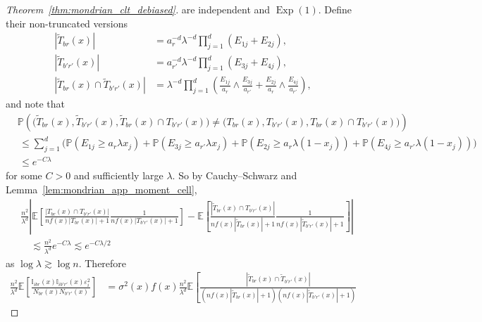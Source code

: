 \documentclass[11pt,lof]{puthesis}
\renewcommand{\P}{\ensuremath{\mathbb{P}}}
\newcommand{\E}{\ensuremath{\mathbb{E}}}
\newcommand{\I}{\ensuremath{\mathbb{I}}}
\DeclareMathOperator{\Exp}{Exp}
\theoremstyle{break}
\theoremstyle{proof}
\newtheorem{proof}{Proof}
\begin{document}
\begin{proof}[Theorem~\ref{thm:mondrian_clt_debiased}]
  are independent and $\Exp(1)$.
  Define their non-truncated versions
  \begin{align*}
    |\tilde T_{b r}(x)|
    &=
    a_r^{-d}
    \lambda^{-d}
    \prod_{j=1}^{d}
    \left( E_{1j} + E_{2j} \right), \\
    |\tilde T_{b' r'}(x)|
    &=
    a_{r'}^{-d}
    \lambda^{-d}
    \prod_{j=1}^{d}
    \left( E_{3j} + E_{4j} \right), \\
    |\tilde T_{b r}(x) \cap \tilde T_{b' r'}(x)|
    &=
    \lambda^{-d}
    \prod_{j=1}^{d}
    \left(
      \frac{E_{1j}}{a_r}
      \wedge
      \frac{E_{3j}}{a_{r'}}
      + \frac{E_{2j}}{a_r}
      \wedge
      \frac{E_{4j}}{a_{r'}}
    \right),
  \end{align*}
  and note that
  \begin{align*}
    &\P \left(
      \big( \tilde T_{b r}(x), \tilde T_{b' r'}(x),
      \tilde T_{b r}(x) \cap T_{b' r'}(x) \big)
      \neq
      \big( T_{b r}(x), T_{b' r'}(x), T_{b r}(x) \cap T_{b' r'}(x) \big)
    \right) \\
    &\,\leq
    \sum_{j=1}^{d}
    \big(
      \P(E_{1j} \geq a_r \lambda x_j)
      + \P(E_{3j} \geq a_{r'} \lambda x_j)
      + \P(E_{2j} \geq a_r \lambda (1 - x_j))
      + \P(E_{4j} \geq a_{r'} \lambda (1 - x_j))
    \big) \\
    &\,\leq e^{-C \lambda}
  \end{align*}
  for some $C > 0$ and sufficiently large $\lambda$.
  So by Cauchy--Schwarz and Lemma~\ref{lem:mondrian_app_moment_cell},
  \begin{align*}
    &
    \frac{n^2}{\lambda^d}
    \left|
    \E \left[
      \frac{|T_{b r}(x) \cap T_{b' r'}(x)|}
      {n f(x) |T_{b r}(x)|+1}
      \frac{1}
      {n f(x) |T_{b' r'}(x)|+1}
    \right]
    - \E \left[
      \frac{|\tilde T_{b r}(x) \cap T_{b' r'}(x)|}
      {n f(x) |\tilde T_{b r}(x)|+1}
      \frac{1}
      {n f(x) |\tilde T_{b' r'}(x)|+1}
    \right]
    \right| \\
    &\quad\lesssim
    \frac{n^2}{\lambda^d}
    e^{-C \lambda}
    \lesssim
    e^{-C \lambda / 2}
  \end{align*}
  as $\log \lambda \gtrsim \log n$.
  Therefore
  \begin{align*}
    \frac{n^2}{\lambda^d}
    \E \left[
      \frac{\I_{i b r}(x) \I_{i b' r'}(x) \varepsilon_i^2}
      {N_{b r}(x) N_{b' r'}(x)}
    \right]
    &=
    \sigma^2(x)
    f(x)
    \frac{n^2}{\lambda^d}
    \E \left[
      \frac{|\tilde T_{b r}(x) \cap \tilde T_{b' r'}(x)|}
      {(n f(x) |\tilde T_{b r}(x)|+1)(n f(x) |\tilde T_{b' r'}(x)|+1)}

\end{align*}
\end{proof}
\end{document}
